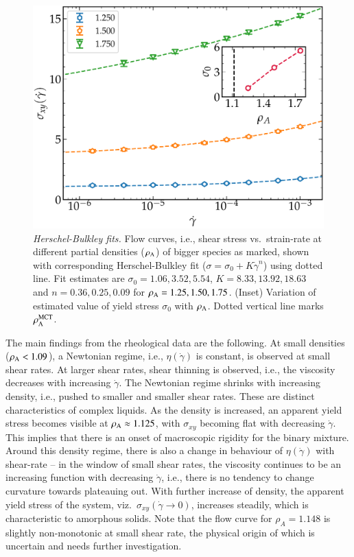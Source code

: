 %
\begin{figure}[htb!]
	\includegraphics[width=14cm]{figs/fig7p4.pdf}
	\centering
	\caption[{\em Herschel-Bulkley fits to estimate the value of yield stress}]{{\em Herschel-Bulkley fits.} Flow curves, i.e., shear stress vs.~strain-rate at different partial densities ($\rho_{\rm A}$) of bigger species as marked, shown with corresponding Herschel-Bulkley fit ($\sigma = \sigma_0+K\dot{\gamma}^n$) using dotted line. Fit estimates are $\sigma_0 = 1.06, 3.52, 5.54$, $K = 8.33, 13.92, 18.63$ and $n = 0.36, 0.25, 0.09$ for $\rho_{\rm A} = 1.25, 1.50, 1.75$. (Inset) Variation of estimated value of yield stress $\sigma_0$ with $\rho_{\rm A}$. Dotted vertical line marks $\rho_{\rm A}^{\rm MCT}$. \label{fig4}}
\end{figure}
%

The main findings from the rheological data are the following. At small densities ($\rho_{\rm A} < 1.09$), a Newtonian regime, i.e., $\eta (\dot{\gamma})$ is constant, is observed at small shear rates. At larger shear rates, shear thinning is observed, i.e., the viscosity decreases with increasing $\dot{\gamma}$. The Newtonian regime shrinks with increasing density, i.e., pushed to smaller and smaller shear rates. These are distinct characteristics of complex liquids. As the density is increased, an apparent yield stress becomes visible at $\rho_{\rm A} \approx 1.125$, with $\sigma_{xy}$ becoming flat with decreasing $\dot{\gamma}$. This implies that there is an onset of macroscopic rigidity for the binary mixture. Around this density regime, there is also a change in behaviour of $\eta (\dot{\gamma})$ with shear-rate -- in the window of small shear rates, the viscosity continues to be an increasing function with decreasing $\dot{\gamma}$, i.e., there is no tendency to change curvature towards plateauing out. With further increase of density, the apparent yield stress of the system, viz.~$\sigma_{xy}(\dot{\gamma} \rightarrow 0)$, increases steadily, which is characteristic to amorphous solids. Note that the flow curve for $\rho_A = 1.148$ is slightly non-monotonic at small shear rate, the physical origin of which is uncertain and needs further investigation.

